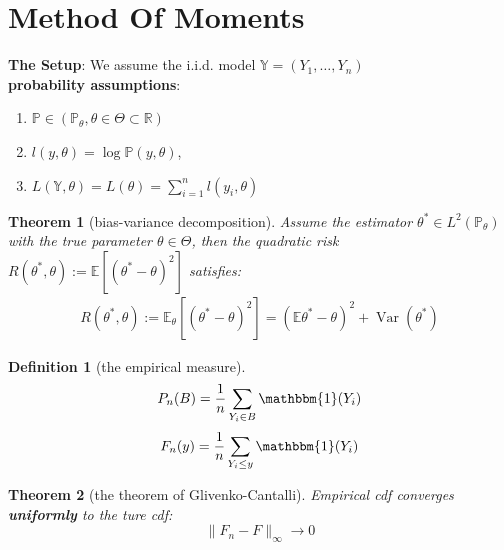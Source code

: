 \documentclass[a4paper,12pt, oneside, fleqn]{book}
\newtheorem{theorem}{Theorem}[section]
\theoremstyle{definition}
\newtheorem{definition}{Definition}[section]
\theoremstyle{remark}
\DeclareMathOperator{\var}{Var}
\begin{document}
\section{Method Of Moments}
\textbf{The Setup}: We assume the i.i.d. model $\mathbb{Y} = (Y_1, \dots, Y_n)$\\
\textbf{probability assumptions}:
\begin{enumerate}
	\item $\mathbb{P} \in (\mathbb{P}_\theta, \theta \in \Theta \subset \mathbb{R})$
	\item $l(y, \theta) = \log \mathbb{P}(y, \theta)$, 
	\item $L(\mathbb{Y}, \theta) = L(\theta) = \sum_{i = 1}^n l(y_i, \theta)$
\end{enumerate} 


\begin{theorem}[bias-variance decomposition]
	Assume the estimator $\theta^* \in L^2(\mathbb{P}_\theta)$ with the true parameter $\theta \in \Theta$, then the quadratic risk $R(\theta^*, \theta):= \mathbb{E}[(\theta^* - \theta)^2]$ satisfies:
	\begin{align*}
		R(\theta^*, \theta) := \mathbb{E}_\theta[(\theta^* - \theta)^2] =  (\mathbb{E}\theta^* - \theta)^2 + \var(\theta^*)
	\end{align*}
\end{theorem}
\begin{definition}[the empirical measure]
\begin{equation*}
	P_n(B) = \frac{1}{n} \sum_{Y_i \in B}\mathbbm{1}(Y_i)
\end{equation*}
\begin{equation*}
	F_n(y) = \frac{1}{n} \sum_{Y_i \leq y} \mathbbm{1}(Y_i)
\end{equation*}
	
\end{definition}


\begin{theorem}[the theorem of Glivenko-Cantalli]
	Empirical cdf converges \textbf{uniformly }to the ture cdf:
	\begin{equation*}
		\|F_n - F\|_\infty \rightarrow0
	\end{equation*}
\end{theorem}
\end{document}

